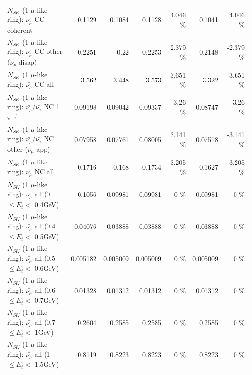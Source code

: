 \begin{table}
\begin{tabular}{| l | r | r | r  r | r  r |}
                       $N_{SK}$ (1 $\mu$-like ring): $\bar{\nu_\mu}$ CC coherent &          0.1129 &          0.1084 &          0.1128 &    4.046 \%  &          0.1041 &   -4.046 \%  \\ 
        $N_{SK}$ (1 $\mu$-like ring): $\bar{\nu_\mu}$ CC other ($\nu_\mu$ disap) &          0.2251 &            0.22 &          0.2253 &    2.379 \%  &          0.2148 &   -2.379 \%  \\ 
                          $N_{SK}$ (1 $\mu$-like ring): $\bar{\nu_{\mu}}$ CC all &           3.562 &           3.448 &           3.573 &    3.651 \%  &           3.322 &   -3.651 \%  \\ 
\hline
  $N_{SK}$ (1 $\mu$-like ring): $\bar{\nu_\mu}$/$\bar{\nu_\tau}$ NC 1$\pi^{+/-}$ &         0.09198 &         0.09042 &         0.09337 &     3.26 \%  &         0.08747 &    -3.26 \%  \\ 
$N_{SK}$ (1 $\mu$-like ring): $\bar{\nu_\mu}$/$\bar{\nu_\tau}$ NC other ($\nu_\mu$ app) &         0.07958 &         0.07761 &         0.08005 &    3.141 \%  &         0.07518 &   -3.141 \%  \\ 
                          $N_{SK}$ (1 $\mu$-like ring): $\bar{\nu_{\mu}}$ NC all &          0.1716 &           0.168 &          0.1734 &    3.205 \%  &          0.1627 &   -3.205 \%  \\ 
\hline
   $N_{SK}$ (1 $\mu$-like ring): $\bar{\nu_{\mu}}$ all (0 $\leq E_{t} <$ 0.4GeV) &          0.1056 &         0.09981 &         0.09981 &        0 \%  &         0.09981 &        0 \%  \\ 
 $N_{SK}$ (1 $\mu$-like ring): $\bar{\nu_{\mu}}$ all (0.4 $\leq E_{t} <$ 0.5GeV) &         0.04076 &         0.03888 &         0.03888 &        0 \%  &         0.03888 &        0 \%  \\ 
 $N_{SK}$ (1 $\mu$-like ring): $\bar{\nu_{\mu}}$ all (0.5 $\leq E_{t} <$ 0.6GeV) &        0.005182 &        0.005009 &        0.005009 &        0 \%  &        0.005009 &        0 \%  \\ 
 $N_{SK}$ (1 $\mu$-like ring): $\bar{\nu_{\mu}}$ all (0.6 $\leq E_{t} <$ 0.7GeV) &         0.01328 &         0.01312 &         0.01312 &        0 \%  &         0.01312 &        0 \%  \\ 
   $N_{SK}$ (1 $\mu$-like ring): $\bar{\nu_{\mu}}$ all (0.7 $\leq E_{t} <$ 1GeV) &          0.2604 &          0.2585 &          0.2585 &        0 \%  &          0.2585 &        0 \%  \\ 
   $N_{SK}$ (1 $\mu$-like ring): $\bar{\nu_{\mu}}$ all (1 $\leq E_{t} <$ 1.5GeV) &          0.8119 &          0.8223 &          0.8223 &        0 \%  &          0.8223 &        0 \%  \\ 

\end{tabular}
\end{table}
